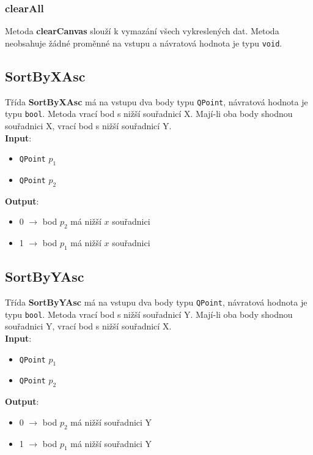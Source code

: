 \documentclass[a4paper, 12pt]{article}
\begin{document}
\subsubsection*{clearAll}
Metoda \textbf{clearCanvas} slouží k vymazání všech vykreslených dat. Metoda neobsahuje žádné proměnné na vstupu a návratová hodnota je typu \texttt{void}.

\subsection{SortByXAsc}
Třída \textbf{SortByXAsc} má na vstupu dva body typu \texttt{QPoint}, návratová hodnota je typu \texttt{bool}. Metoda vrací bod s nižší  souřadnicí X. Mají-li oba body shodnou souřadnici X, vrací bod s nižší souřadnicí Y.\\

\textbf{Input}:
\begin{itemize}
\item \texttt{QPoint} $p_1$
\item \texttt{QPoint} $p_2$
\end{itemize}

\textbf{Output}:
\begin{itemize}
\item 0 $\rightarrow$ bod $p_2$ má nižší $x$ souřadnici
\item 1 $\rightarrow$ bod $p_1$ má nižší $x$ souřadnici
\end{itemize}

\subsection{SortByYAsc}
Třída \textbf{SortByYAsc} má na vstupu dva body typu \texttt{QPoint}, návratová hodnota je typu \texttt{bool}. Metoda vrací bod s nižší  souřadnicí Y. Mají-li oba body shodnou souřadnici Y, vrací bod s nižší souřadnicí X.\\

\textbf{Input}:
\begin{itemize}
\item \texttt{QPoint} $p_1$
\item \texttt{QPoint} $p_2$
\end{itemize}

\textbf{Output}:
\begin{itemize}
\item 0 $\rightarrow$ bod $p_2$ má nižší souřadnici Y
\item 1 $\rightarrow$ bod $p_1$ má nižší souřadnici Y
\end{itemize}
\end{document}
